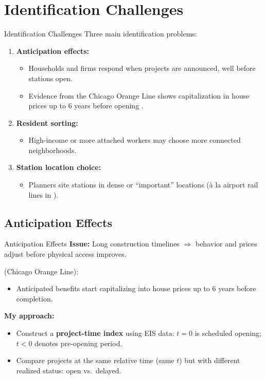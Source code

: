 \documentclass{beamer}
\begin{document}
\section{Identification Challenges}
\begin{frame}{Identification Challenges}
\small
Three main identification problems:
\begin{enumerate}
    \item \textbf{Anticipation effects:}
    \begin{itemize}
        \item Households and firms respond when projects are announced, well before stations open.
        \item Evidence from the Chicago Orange Line shows capitalization in house prices up to 6 years before opening \parencite{mcmillen_reaction_2004}.
    \end{itemize}
    \item \textbf{Resident sorting:}
    \begin{itemize}
        \item High-income or more attached workers may choose more connected neighborhoods.
    \end{itemize}
    \item \textbf{Station location choice:}
    \begin{itemize}
        \item Planners site stations in dense or “important” locations (\`a la airport rail lines in \textcite{tyndall_airports}).
    \end{itemize}
\end{enumerate}
\end{frame}

\subsection{Anticipation Effects}
\begin{frame}{Anticipation Effects}
\small
\textbf{Issue:} Long construction timelines $\Rightarrow$ behavior and prices adjust before physical access improves.

\medskip
\textcite{mcmillen_reaction_2004} (Chicago Orange Line):
\begin{itemize}
    \item Anticipated benefits start capitalizing into house prices up to 6 years before completion.
\end{itemize}

\medskip
\textbf{My approach:}
\begin{itemize}
    \item Construct a \textbf{project-time index} using EIS data: $t=0$ is scheduled opening; $t<0$ denotes pre-opening period.
    \item Compare projects at the same relative time (same $t$) but with different realized status: open vs.\ delayed.
\end{itemize}
\end{frame}
\end{document}
